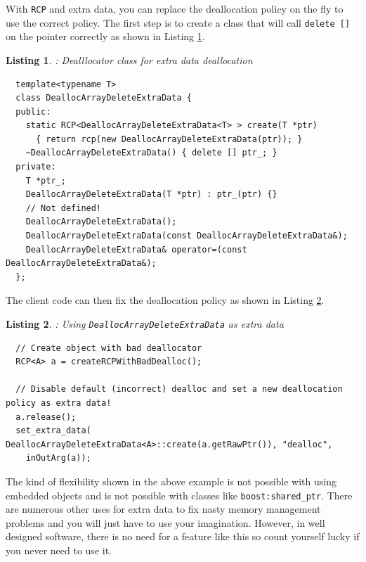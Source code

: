 \documentclass[pdf,ps2pdf,11pt]{SANDreport}
\newtheorem{listing}{Listing}
\begin{document}
With {}\texttt{RCP} and extra data, you can replace the deallocation
policy on the fly to use the correct policy.  The first step is to
create a class that will call {}\texttt{delete []} on the pointer
correctly as shown in Listing
{}\ref{listing:DeallocArrayDeleteExtraData}.

\begin{listing}: Dealllocator class for extra data deallocation \\
\label{listing:DeallocArrayDeleteExtraData}
{\small\begin{verbatim}
  template<typename T>
  class DeallocArrayDeleteExtraData {
  public:
    static RCP<DeallocArrayDeleteExtraData<T> > create(T *ptr)
      { return rcp(new DeallocArrayDeleteExtraData(ptr)); }
    ~DeallocArrayDeleteExtraData() { delete [] ptr_; }
  private:
    T *ptr_;
    DeallocArrayDeleteExtraData(T *ptr) : ptr_(ptr) {}
    // Not defined!
    DeallocArrayDeleteExtraData();
    DeallocArrayDeleteExtraData(const DeallocArrayDeleteExtraData&);
    DeallocArrayDeleteExtraData& operator=(const DeallocArrayDeleteExtraData&);
  };
\end{verbatim}}
\end{listing}

The client code can then fix the deallocation policy as shown in
Listing {}\ref{listing:using-DeallocArrayDeleteExtraData}.

\begin{listing}: Using {}\texttt{DeallocArrayDeleteExtraData} as extra data \\
\label{listing:using-DeallocArrayDeleteExtraData}
{\small\begin{verbatim}
  // Create object with bad deallocator
  RCP<A> a = createRCPWithBadDealloc();

  // Disable default (incorrect) dealloc and set a new deallocation policy as extra data!
  a.release();
  set_extra_data( DeallocArrayDeleteExtraData<A>::create(a.getRawPtr()), "dealloc",
    inOutArg(a));
\end{verbatim}}
\end{listing}

The kind of flexibility shown in the above example is not possible
with using embedded objects and is not possible with classes like
{}\texttt{boost:shared\_ptr}.  There are numerous other uses for extra
data to fix nasty memory management problems and you will just have to
use your imagination.  However, in well designed software, there is no
need for a feature like this so count yourself lucky if you never need
to use it.
\end{document}
